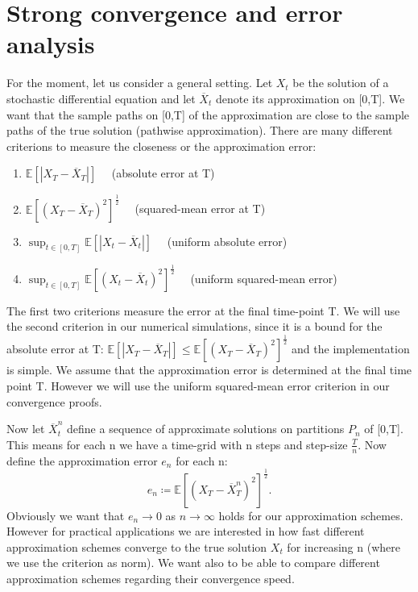 \section{Strong convergence and error analysis}
\label{erroranalysis}
For the moment, let us consider a general setting. Let \(X_t\) be the solution of a stochastic differential equation and let  \(\overline{X}_{t}\) denote its approximation on [0,T].  
We want that the sample paths on [0,T] of the approximation are close to the sample paths of the true solution (pathwise approximation).
There are many different criterions to measure the closeness or the approximation error:
\begin{enumerate}[noitemsep,topsep=0mm,labelindent=6mm,leftmargin=*,widest=3.,align=right]
\item \(\mathbb{E}[|X_T - \overline{X}_{T}|]\quad\) (absolute error at T)
\item \(\mathbb{E}[(X_T - \overline{X}_{T})^2]^{\frac{1}{2}}\quad\) (squared-mean error at T)
\item \(\sup_{t\in[0,T]}\mathbb{E}[|X_t - \overline{X}_{t}|]\quad\) (uniform absolute error)
\item \(\sup_{t\in[0,T]}\mathbb{E}[(X_t - \overline{X}_{t})^2]^{\frac{1}{2}}\quad\) (uniform squared-mean error)
\end{enumerate}
The first two criterions measure the error at the final time-point T. We will use the second criterion in our numerical simulations, since it is a bound for the absolute error at T: \(\mathbb{E}[|X_T - \overline{X}_{T}|]\leq\mathbb{E}[(X_T - \overline{X}_{T})^2]^{\frac{1}{2}}\) and the implementation is simple. We assume that the approximation error is determined at the final time point T. However we will use the uniform squared-mean error criterion in our convergence proofs.

Now let \(\overline{X}^{n}_{t}\) define a sequence of approximate solutions on partitions \(P_n\) of [0,T]. This means for each n we have a time-grid with n steps and step-size \(\frac{T}{n}\).
Now define the approximation error \(e_n\) for each n:
\[e_n\coloneqq\mathbb{E}[(X_T - \overline{X}^{n}_{T})^2]^{\frac{1}{2}}.\]
Obviously we want that \(e_n\to 0\) as \(n\to\infty\) holds for our approximation schemes. However for practical applications we are interested in how fast different approximation schemes converge to the true solution \(X_t\) for increasing n (where we use the criterion as norm).
We want also to be able to compare different approximation schemes regarding their convergence speed. 

